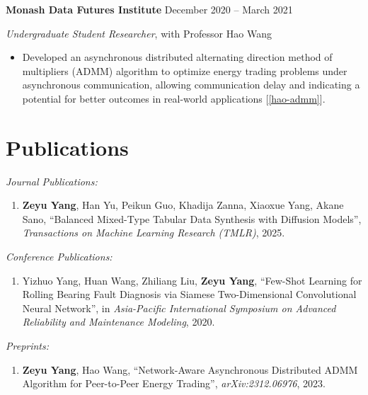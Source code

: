 \documentclass[11pt]{article}
\begin{document}
\vspace{\lineskip}

\textbf{Monash Data Futures Institute} \hfill December 2020 -- March 2021

\textit{Undergraduate Student Researcher}, with Professor Hao Wang

\begin{itemize}
    \item Developed an asynchronous distributed alternating direction method of multipliers (ADMM) algorithm to optimize energy trading problems under asynchronous communication, allowing communication delay and indicating a potential for better outcomes in real-world applications [\ref{hao-admm}].
\end{itemize}

\section*{Publications}

\textit{Journal Publications:}

\begin{enumerate}
    \item \label{akane-ddpm} \textbf{Zeyu Yang}, Han Yu, Peikun Guo, Khadija Zanna, Xiaoxue Yang, Akane Sano,
    ``Balanced Mixed-Type Tabular Data Synthesis with Diffusion Models'', \textit{Transactions on Machine Learning Research (TMLR)}, 2025.
\end{enumerate}

\vspace{\lineskip}
    
\textit{Conference Publications:}

\begin{enumerate}[resume]
    \item Yizhuo Yang, Huan Wang, Zhiliang Liu, \textbf{Zeyu Yang}, 
    ``Few-Shot Learning for Rolling Bearing Fault Diagnosis via Siamese Two-Dimensional Convolutional Neural Network'', 
    in \textit{Asia-Pacific International Symposium on Advanced Reliability and Maintenance Modeling}, 2020.
\end{enumerate}

\textit{Preprints:}

\begin{enumerate}[resume]
    \item \label{hao-admm} \textbf{Zeyu Yang}, Hao Wang, 
    ``Network-Aware Asynchronous Distributed ADMM Algorithm for Peer-to-Peer Energy Trading'', \textit{arXiv:2312.06976}, 2023.
\end{enumerate}
\end{document}
